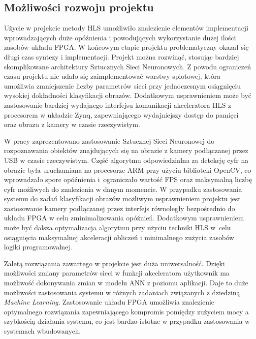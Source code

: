 \subsection{Możliwości rozwoju projektu}

Użycie w projekcie metody HLS umożliwiło znalezienie elementów implementacji wprowadzających duże opóźnienia i powodujących wykorzystanie dużej ilości zasobów układu FPGA. W końcowym etapie projektu problematyczny okazał się długi czas syntezy i implementacji. Projekt można rozwinąć, stosując bardziej skomplikowane architektury Sztucznych Sieci Neuronowych. Z powodu ograniczeń czasu projektu nie udało się zaimplementować warstwy splotowej, która umożliwia zmniejszenie liczby parametrów sieci przy jednoczesnym osiągnięciu wysokiej dokładności klasyfikacji obrazów. Dodatkowym usprawnieniem może być zastosowanie bardziej wydajnego interfejsu komunikacji akceleratora HLS z procesorem w układzie Zynq, zapewniającego wydajniejszy dostęp do pamięci oraz obrazu z kamery w czasie rzeczywistym.

W pracy zaprezentowano zastosowanie Sztucznej Sieci Neuronowej do rozpoznawania obiektów 
znajdujących się na obrazie z kamery podłączanej przez USB w czasie rzeczywistym. Część algorytmu 
odpowiedzialna za detekcję cyfr na obrazie była uruchamiana na procesorze ARM przy użyciu 
biblioteki OpenCV, co wprowadzało spore opóźnienia i~ograniczało wartość FPS oraz maksymalną liczbę 
cyfr możliwych do znalezienia w danym momencie. W przypadku zastosowania systemu do zadań 
klasyfikacji obrazów możliwym usprawnieniem projektu jest zastosowanie kamery podłączanej przez 
interfejs równoległy bezpośrednio do układu FPGA w celu zminimalizowania opóźnień. Dodatkowym 
usprawnieniem może być dalsza optymalizacja algorytmu przy użyciu techniki HLS w~celu osiągnięcia maksymalnej akceleracji obliczeń i minimalnego zużycia zasobów logiki programowalnej.

Zaletą rozwiązania zawartego w projekcie jest duża uniwersalność. Dzięki możliwości zmiany 
parametrów sieci w funkcji akceleratora użytkownik ma możliwość dokonywania zmian w modelu ANN z 
poziomu aplikacji. Daje to duże możliwości zastosowania systemu w różnych zadaniach związanych z 
dziedziną \emph{Machine Learning}. Zastosowanie układu FPGA umożliwia znalezienie optymalnego 
rozwiązania zapewniającego kompromis pomiędzy zużyciem mocy a szybkością działania systemu, co jest bardzo istotne w przypadku zastosowania w systemach wbudowanych.
